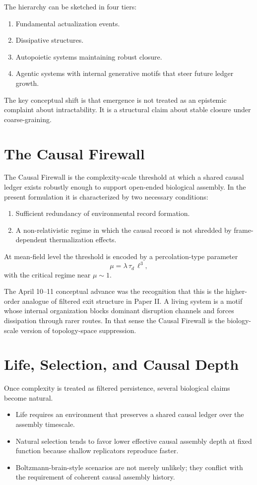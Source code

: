 \documentclass[11pt]{article}
\begin{document}
The hierarchy can be sketched in four tiers:
\begin{enumerate}[label=\arabic*.]
    \item Fundamental actualization events.
    \item Dissipative structures.
    \item Autopoietic systems maintaining robust closure.
    \item Agentic systems with internal generative motifs that steer future ledger growth.
\end{enumerate}

The key conceptual shift is that emergence is not treated as an epistemic complaint about intractability. It is a structural claim about stable closure under coarse-graining.

\section{The Causal Firewall}
The Causal Firewall is the complexity-scale threshold at which a shared causal ledger exists robustly enough to support open-ended biological assembly. In the present formulation it is characterized by two necessary conditions:
\begin{enumerate}[label=F\arabic*.]
    \item Sufficient redundancy of environmental record formation.
    \item A non-relativistic regime in which the causal record is not shredded by frame-dependent thermalization effects.
\end{enumerate}

At mean-field level the threshold is encoded by a percolation-type parameter
\begin{equation}
\mu=\lambda\,\tau_d\,\ell^3,
\end{equation}
with the critical regime near $\mu\sim 1$.

The April 10--11 conceptual advance was the recognition that this is the higher-order analogue of filtered exit structure in Paper II. A living system is a motif whose internal organization blocks dominant disruption channels and forces dissipation through rarer routes. In that sense the Causal Firewall is the biology-scale version of topology-space suppression.

\section{Life, Selection, and Causal Depth}
Once complexity is treated as filtered persistence, several biological claims become natural.
\begin{itemize}
    \item Life requires an environment that preserves a shared causal ledger over the assembly timescale.
    \item Natural selection tends to favor lower effective causal assembly depth at fixed function because shallow replicators reproduce faster.
    \item Boltzmann-brain-style scenarios are not merely unlikely; they conflict with the requirement of coherent causal assembly history.
\end{itemize}
\end{document}
